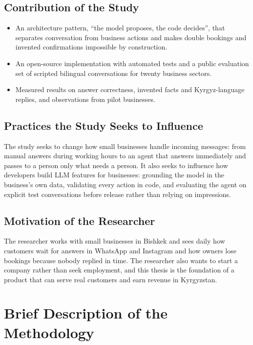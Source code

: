 \subsection{Contribution of the Study}

\begin{itemize}
	\item An architecture pattern, \enquote{the model proposes, the code decides}, that separates conversation from
	business actions and makes double bookings and invented confirmations impossible by construction.
	\item An open-source implementation \parencite{asilov2026joop} with automated tests and a public evaluation set of
	scripted bilingual conversations for twenty business sectors.
	\item Measured results on answer correctness, invented facts and Kyrgyz-language replies, and observations from pilot
	businesses.
\end{itemize}

\subsection{Practices the Study Seeks to Influence}

The study seeks to change how small businesses handle incoming messages: from manual answers during working hours to an
agent that answers immediately and passes to a person only what needs a person. It also seeks to influence how
developers build LLM features for businesses: grounding the model in the business's own data, validating every action in
code, and evaluating the agent on explicit test conversations before release rather than relying on impressions.

\subsection{Motivation of the Researcher}

The researcher works with small businesses in Bishkek and sees daily how customers wait for answers in WhatsApp and
Instagram and how owners lose bookings because nobody replied in time. The researcher also wants to start a company
rather than seek employment, and this thesis is the foundation of a product that can serve real customers and earn
revenue in Kyrgyzstan.

\section{Brief Description of the Methodology}

